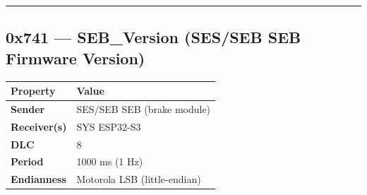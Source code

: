 \documentclass[12pt,a4paper,oneside]{report}
\begin{document}
\begin{center}\rule{0.5\linewidth}{0.5pt}\end{center}

\subsection{0x741 --- SEB\_Version (SES/SEB SEB Firmware
Version)}\label{x741-seb_version-SES/SEB-seb-firmware-version}

\begin{longtable}[]{@{}ll@{}}
\toprule\noalign{}
Property & Value \\
\midrule\noalign{}
\endhead
\bottomrule\noalign{}
\endlastfoot
\textbf{Sender} & SES/SEB SEB (brake module) \\
\textbf{Receiver(s)} & SYS ESP32-S3 \\
\textbf{DLC} & 8 \\
\textbf{Period} & 1000 ms (1 Hz) \\
\textbf{Endianness} & Motorola LSB (little-endian) \\
\end{longtable}
\end{document}
